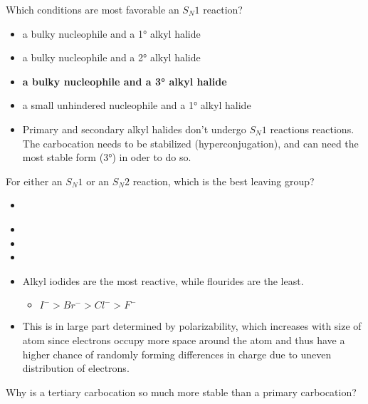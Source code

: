 \documentclass[12pt,a4paper]{article}
\begin{document}
\begin{enumerate}
    {\color{G-Moon}\item Which conditions are most favorable an \(S_N1\) reaction?
    \begin{itemize}
        \item a bulky nucleophile and a \ang{1} alkyl halide
        \item a bulky nucleophile and a \ang{2} alkyl halide
        \item {\color{o-Sun}\textbf{a bulky nucleophile and a \ang{3} alkyl halide}}
        \item a small unhindered nucleophile and a \ang{1} alkyl halide
    \end{itemize}}
        \begin{itemize}
            \item Primary and secondary alkyl halides don't undergo \(S_N1\) reactions reactions. The carbocation needs to be stabilized (hyperconjugation), and can need the most stable form (\ang{3}) in oder to do so.
        \end{itemize}
    {\color{G-Moon}\item For either an \(S_N1\) or an \(S_N2\) reaction, which is the best leaving group?
    \begin{itemize}
        \item {\color{o-Sun}\textbf{}}
        \item {}
        \item {}
        \item {}
    \end{itemize}}
        \begin{itemize}
            \item Alkyl iodides are the most reactive, while flourides are the least.
            \begin{itemize}
                \item \(I^->Br^->Cl^->F^-\)
            \end{itemize}
            \item This is in large part determined by {\color{o-Sun}polarizability}, which {\color{o-Sun}increases with size of atom} since electrons occupy more space around the atom and thus have a higher chance of randomly forming differences in charge due to uneven distribution of electrons.
        \end{itemize}
    {\color{G-Moon}\item Why is a tertiary carbocation so much more stable than a primary carbocation?
    \begin{itemize}

\end{itemize}}
\end{enumerate}
\end{document}
